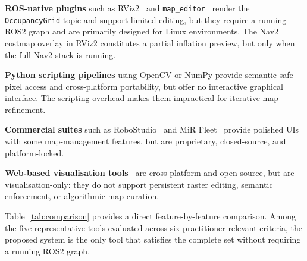 \documentclass[journal]{IEEEtran}
\begin{document}
\textbf{ROS-native plugins} such as RViz2~\cite{rviz2} and
\texttt{map\_editor}~\cite{mapeditor} render the \texttt{OccupancyGrid} topic
and support limited editing, but they require a running ROS2 graph and are
primarily designed for Linux environments.  The Nav2 costmap overlay in
RViz2 constitutes a partial inflation preview, but only when the full Nav2
stack is running.

\textbf{Python scripting pipelines} using OpenCV or NumPy provide
semantic-safe pixel access and cross-platform portability, but offer no
interactive graphical interface.  The scripting overhead makes them
impractical for iterative map refinement.

\textbf{Commercial suites} such as RoboStudio~\cite{robostudio} and MiR
Fleet~\cite{mirfleet} provide polished UIs with some map-management features,
but are proprietary, closed-source, and platform-locked.

\textbf{Web-based visualisation tools}~\cite{foxglove,webviz} are
cross-platform and open-source, but are visualisation-only: they do not
support persistent raster editing, semantic enforcement, or algorithmic map
curation.

Table~\ref{tab:comparison} provides a direct feature-by-feature comparison.
Among the five representative tools evaluated across six practitioner-relevant
criteria, the proposed system is the only tool that satisfies the complete set
without requiring a running ROS2 graph.
\end{document}
